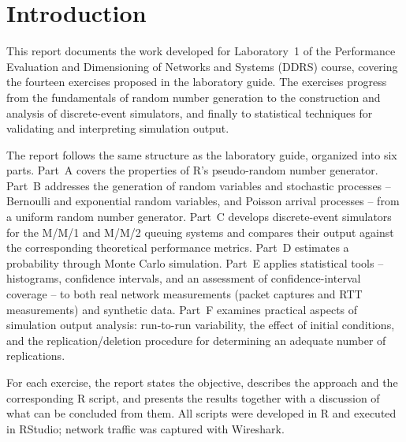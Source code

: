 \documentclass[12pt]{article}
\begin{document}
\thispagestyle{empty}
\setcounter{page}{0}
\newpage

\tableofcontents 
\newpage


\section{Introduction}

This report documents the work developed for Laboratory~1 of the Performance Evaluation and Dimensioning of Networks and Systems (DDRS) course, covering the fourteen exercises proposed in the laboratory guide. The exercises progress from the fundamentals of random number generation to the construction and analysis of discrete-event simulators, and finally to statistical techniques for validating and interpreting simulation output.

The report follows the same structure as the laboratory guide, organized into six parts. Part~A covers the properties of R's pseudo-random number generator. Part~B addresses the generation of random variables and stochastic processes -- Bernoulli and exponential random variables, and Poisson arrival processes -- from a uniform random number generator. Part~C develops discrete-event simulators for the M/M/1 and M/M/2 queuing systems and compares their output against the corresponding theoretical performance metrics. Part~D estimates a probability through Monte Carlo simulation. Part~E applies statistical tools -- histograms, confidence intervals, and an assessment of confidence-interval coverage -- to both real network measurements (packet captures and RTT measurements) and synthetic data. Part~F examines practical aspects of simulation output analysis: run-to-run variability, the effect of initial conditions, and the replication/deletion procedure for determining an adequate number of replications.

For each exercise, the report states the objective, describes the approach and the corresponding R script, and presents the results together with a discussion of what can be concluded from them. All scripts were developed in R and executed in RStudio; network traffic was captured with Wireshark.
\end{document}
